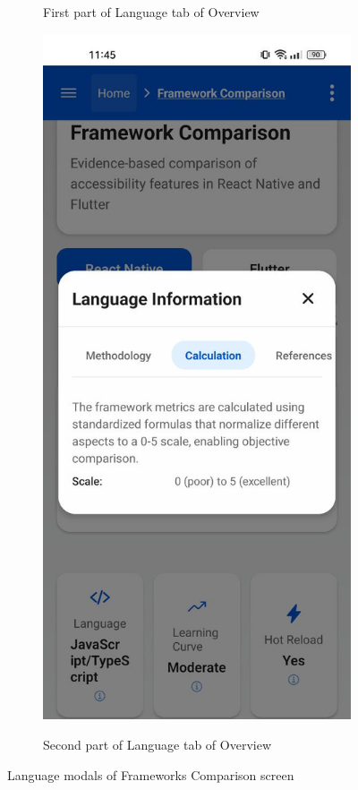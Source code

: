 \begin{figure}[ht]
\begin{subfigure}[b]{0.48\textwidth}
        \caption{First part of Language tab of Overview}
        \label{fig:language-1}
    \end{subfigure}
    \hfill
    \begin{subfigure}[b]{0.48\textwidth}
        \centering
        \includegraphics[width=\linewidth, alt={Second part of Language in Overview tab of the Frameworks Comparison screen}]{img/language-calculation.jpg}
        \caption{Second part of Language tab of Overview}
        \label{fig:language-2}
    \end{subfigure}
    \caption{Language modals of Frameworks Comparison screen}
    \label{fig:feature_implementation_sidebyside}
\end{figure}


